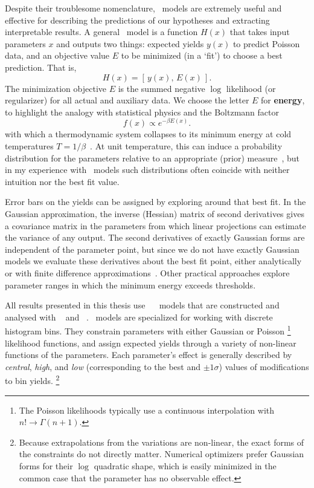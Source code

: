 Despite their troublesome nomenclature, \heplikelihood\ models are extremely
useful and effective for describing the predictions of our hypotheses and
extracting interpretable results.
A general \heplikelihood\ model is a function $H(x)$ that takes input
parameters $x$ and outputs two things:
expected yields $y(x)$ to predict Poisson data,
and an objective value $E$ to be minimized (in a `fit') to choose a best
prediction.
That is,
\begin{equation}
H(x) = [\,y(x), \,E(x)\,]
.
\end{equation}
The minimization objective $E$ is the summed negative $\log$ likelihood
(or regularizer) for all actual and auxiliary data.
We choose the letter $E$ for \textbf{energy}, to highlight the analogy with
statistical physics and the Boltzmann factor
\begin{equation}
f(x) \propto e^{-\beta E(x)}
.
\end{equation}
with which a thermodynamic system collapses to its minimum energy at cold
temperatures $T = 1/\beta$~\cite{
skilling2017david,
lecun-06,
pmlr-v2-ranzato07a
}.
At unit temperature, this can induce a probability distribution
for the parameters relative to an appropriate (prior)
measure~\cite{cranmer2012histfactory, skilling2017david},
but in my experience with \heplikelihood\ models such distributions often
coincide with neither intuition nor the best fit value.

Error bars on the yields can be assigned by exploring around that best fit.
In the Gaussian approximation, the inverse (Hessian) matrix of second
derivatives gives a covariance matrix in the parameters from which linear
projections can estimate the variance of any output.
The second derivatives of exactly Gaussian forms are independent of the
parameter point, but since we do not have exactly Gaussian models we evaluate
these derivatives about the best fit point, either analytically or with finite
difference approximations~\cite{cranmer2021building}.
Other practical approaches explore parameter ranges in which the minimum energy
exceeds thresholds.

All results presented in this thesis use
\histfactory~\cite{cranmer2012histfactory} \heplikelihood\ models that are
constructed and analysed with
\histfitter~\cite{Besjes_2015,baak2015histfitter}
and \pyhf~\cite{heinrich2021pyhf}.
\histfactory\ models are specialized for working with discrete histogram bins.
They constrain parameters with either Gaussian or Poisson%
\footnote{%
The Poisson likelihoods typically use a continuous interpolation with
$n!\rightarrow \Gamma(n + 1)$.%
}
likelihood
functions, and assign expected yields through a variety of
non-linear functions of the parameters.
Each parameter's effect is generally described by
\emph{central}, \emph{high}, and \emph{low}
(corresponding to the best and $\pm1\sigma$)
values of modifications to bin yields.%
\footnote{%
Because extrapolations from the variations are non-linear, the exact forms of
the constraints do not directly matter.
Numerical optimizers prefer Gaussian forms for their $\log$ quadratic shape, which is
easily minimized in the common case that the parameter has no observable
effect.%
}

